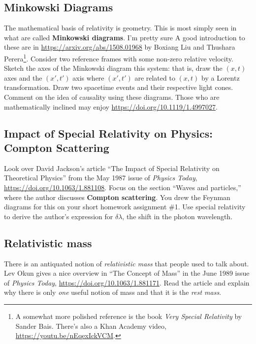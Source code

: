 \documentclass[12pt]{article}
\numberwithin{equation}{section}    %
\begin{document}
\subsection{Minkowski Diagrams}

The mathematical basis of relativity is geometry. This is most simply seen in what are called \textbf{Minkowski diagrams}. I'm pretty sure  A good introduction to these are in \url{https://arxiv.org/abs/1508.01968} by Boxiang Liu and Thushara Perera\footnote{A somewhat more polished reference is the book \emph{Very Special Relativity} by Sander Bais. There's also a Khan Academy video, \url{https://youtu.be/nEqexIckVCM}.}. Consider two reference frames with some non-zero relative velocity. Sketch the axes of the Minkowski diagram this system: that is, draw the $(x,t)$ axes and the $(x',t')$ axis where $(x',t')$ are related to $(x,t)$ by a Lorentz transformation.  Draw two spacetime events and their respective light cones. Comment on the idea of causality using these diagrams. Those who are mathematically inclined may enjoy \url{https://doi.org/10.1119/1.4997027}. 

\subsection{Impact of Special Relativity on Physics: Compton Scattering}

Look over David Jackson's article ``The Impact of Special Relativity on Theoretical Physics'' from the May 1987 issue of \emph{Physics Today}, \url{https://doi.org/10.1063/1.881108}. Focus on the section ``Waves and particles,'' where the author discusses \textbf{Compton scattering}. You drew the Feynman diagrams for this on your short homework assignment \#1. Use special relativity to derive the author's expression for $\delta\lambda$, the shift in the photon wavelength.

\subsection{Relativistic mass}

There is an antiquated notion of \emph{relativistic mass} that people used to talk about. Lev Okun gives a nice overview in ``The Concept of Mass'' in the June 1989 issue of \emph{Physics Today}, \url{https://doi.org/10.1063/1.881171}. Read the article and explain why there is only \emph{one} useful notion of mass and that it is the \emph{rest mass}.
\end{document}
